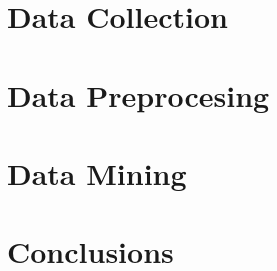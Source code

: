\documentclass{book}
\begin{document}
    \chapter{Data Collection}
    \paragraph{}

    

    \chapter{Data Preprocesing}
    \chapter{Data Mining}
    \chapter{Conclusions}
\end{document}
